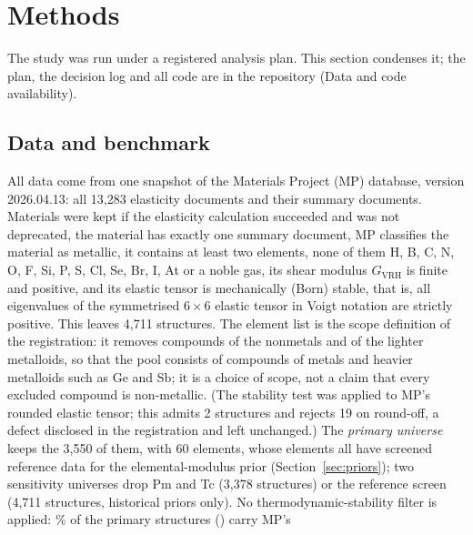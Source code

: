 \section{Methods}\label{sec:methods}

The study was run under a registered analysis plan\cite{asad2026registrationv1,asad2026registration}. This section condenses it; the plan,
the decision log and all code are in the repository (Data and code availability).

\subsection{Data and benchmark}\label{sec:data}
All data come from one snapshot of the Materials Project (MP) database, version 2026.04.13\cite{jain2013materialsproject,asad2026snapshot}:
all 13,283 elasticity documents\cite{dejong2015charting} and their summary documents. Materials were kept if the elasticity calculation
succeeded and was not deprecated, the material has exactly one summary document, MP classifies the material as metallic, it contains at least two elements, none of them H, B, C, N,
O, F, Si, P, S, Cl, Se, Br, I, At or a noble gas, its shear modulus $G_{\mathrm{VRH}}$ is finite and positive, and its elastic
tensor is mechanically (Born) stable, that is, all eigenvalues of the symmetrised $6\times6$ elastic tensor in Voigt notation are
strictly positive. This leaves 4,711 structures. The element list is the scope definition of the registration: it removes
compounds of the nonmetals and of the lighter metalloids, so that the pool consists of compounds of metals and heavier metalloids
such as Ge and Sb; it is a choice of scope, not a claim that every excluded compound is non-metallic. (The stability test was applied to MP's rounded elastic
tensor; this admits 2 structures and rejects 19 on round-off, a defect disclosed in the registration and left unchanged.) The \emph{primary universe} keeps the 3,550 of them, with 60
elements, whose elements all have screened reference data for the elemental-modulus prior (Section~\ref{sec:priors}); two
sensitivity universes drop Pm and Tc (3,378 structures) or the reference screen (4,711 structures, historical priors only). No
thermodynamic-stability filter is applied: \% of the primary structures () carry MP's
